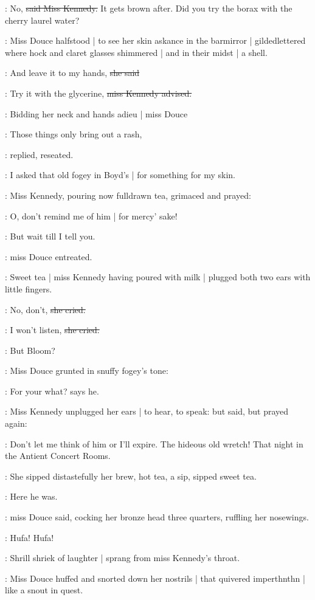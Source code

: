\MissK:
No,
\sout{said Miss Kennedy.}
It gets brown after.
Did you try the borax with the cherry laurel water?

:
Miss Douce halfstood |
to see her skin askance in the barmirror |
gildedlettered where hock and claret glasses shimmered |
and in their midst |
a shell.

\MissD:
And leave it to my hands,
\sout{she said}

\MissK:
Try it with the glycerine,
\sout{miss Kennedy advised.}

:
Bidding her neck and hands adieu |
miss Douce

\MissD:
Those things only bring out a rash,

:
replied,
reseated.

\MissD:
I asked that old fogey in Boyd's |
for something for my skin.

:
Miss Kennedy,
pouring now fulldrawn tea,
grimaced and prayed:

\MissK:
O, don't remind me of him |
for mercy' sake!

\MissD:
But wait till I tell you.

:
miss Douce entreated.

:
Sweet tea |
miss Kennedy having poured with milk |
plugged both two ears
with little fingers.

\MissK:
No,
don't,
\sout{she cried.}

\MissK:
I won't listen,
\sout{she cried.}

:
But Bloom?

:
Miss Douce grunted in snuffy fogey's tone:

\MissD:
For your what?
says he.

:
Miss Kennedy unplugged her ears |
to hear,
to speak:
but said,
but prayed again:

\MissK:
Don't let me think of him or I'll expire.
The hideous old wretch!
That night in the Antient Concert Rooms.

:
She sipped distastefully her brew,
hot tea,
a sip,
sipped sweet tea.

\MissD:
Here he was.

:
miss Douce said,
cocking her bronze head three quarters,
ruffling her nosewings.

\MissD:
Hufa!
Hufa!

:
Shrill shriek of laughter |
sprang from miss Kennedy's throat.

:
Miss Douce huffed and snorted down her nostrils |
that quivered imperthnthn |
like a snout in quest.

